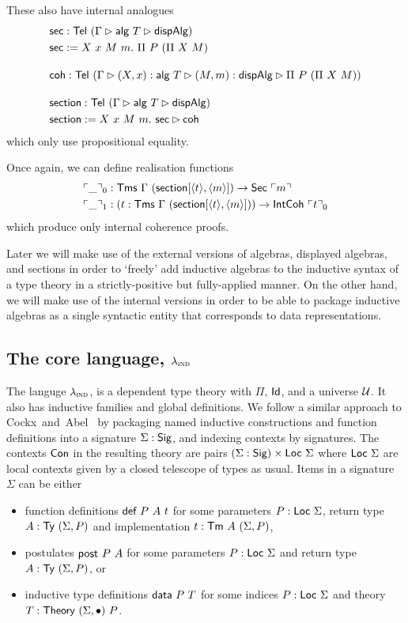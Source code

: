These also have internal analogues
\begin{align*}
    &\textsf{sec} : \textsf{Tel}\ (\Gamma \rhd \textsf{alg}\ T \rhd \textsf{dispAlg}) \\
    &\textsf{sec} := X\ x\ M\ m.\ \Pi\ P\ (\Pi\ X\ M) \\[1em]
    &\textsf{coh} : \textsf{Tel}\ (\Gamma \rhd (X, x) : \textsf{alg}\ T\rhd (M, m) : \textsf{dispAlg} \rhd \Pi\ P\ (\Pi\ X\ M)) \\[1em]
    &\textsf{section} : \textsf{Tel}\ (\Gamma \rhd \textsf{alg}\ T \rhd \textsf{dispAlg}) \\
    &\textsf{section} := X\ x\ M\ m.\ \textsf{sec} \rhd \textsf{coh}
\end{align*}
which only use propositional equality.

Once again, we can define realisation functions
\begin{align*}
    &\emb{\_}_0 : \Tms\ \Gamma\ (\mta{section}[\Msub{t},\Msub{m}]) \to \mta{Sec}\ \emb{m} \\
    &\emb{\_}_1 : (t : \Tms\ \Gamma\ (\mta{section}[\Msub{t},\Msub{m}])) \to \mta{IntCoh}\ \emb{t}_0
\end{align*}
which produce only internal coherence proofs.

Later we will make use of the external versions of algebras, displayed algebras,
and sections in order to `freely' add inductive algebras to the inductive syntax
of a type theory in a strictly-positive but fully-applied manner. On the other
hand, we will make use of the internal versions in order to be able to package
inductive algebras as a single syntactic entity that corresponds to data
representations.

\subsection{The core language, $\lambda_{\textsc{ind}}$}\label{sub:lambdaind}

The languge $\lambda_{\textsc{ind}}$, is a dependent type theory with $\Pi$, $\textsf{Id}$, and
a universe $\mathcal{U}$.
It also has inductive families and global definitions. We follow a similar
approach to Cockx~and~Abel~\cite{Cockx2018-fk} by packaging named inductive
constructions and function definitions into a signature $\Sigma : \textsf{Sig}$, and
indexing contexts by signatures. The contexts $\textsf{Con}$ in the resulting theory are
pairs $(\Sigma : \textsf{Sig}) \times \textsf{Loc}\ \Sigma$ where $\Loc\ \Sigma$ are local
contexts given by a closed telescope of types as usual. Items in a signature
$\Sigma$ can be either

\begin{itemize}
	\item function definitions $\mta{def}\ P\ A\ t$ for some parameters $P : \textsf{Loc}\
		      \Sigma$, return type $A : \textsf{Ty}\ (\Sigma, P)$ and implementation $t : \textsf{Tm}\ A\ (\Sigma, P)$,
	\item postulates $\textsf{post}\ P\ A$ for some parameters $P : \textsf{Loc}\
		      \Sigma$ and return type $A : \textsf{Ty}\ (\Sigma, P)$, or
	\item inductive type definitions $\mta{data}\ P\ T$ for some indices $P :
		      \textsf{Loc}\ \Sigma$ and theory $T : \textsf{Theory}\ (\Sigma, \bullet)\ P$.
\end{itemize}

